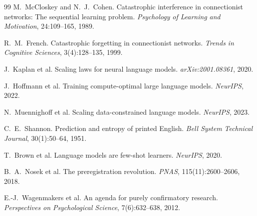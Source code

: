 \documentclass[11pt,a4paper]{article}
\begin{document}
\begin{thebibliography}{99}
M.~McCloskey and N.~J.~Cohen.
\newblock Catastrophic interference in connectionist networks: The sequential learning problem.
\newblock \emph{Psychology of Learning and Motivation}, 24:109--165, 1989.

R.~M.~French.
\newblock Catastrophic forgetting in connectionist networks.
\newblock \emph{Trends in Cognitive Sciences}, 3(4):128--135, 1999.

J.~Kaplan et al.
\newblock Scaling laws for neural language models.
\newblock \emph{arXiv:2001.08361}, 2020.

J.~Hoffmann et al.
\newblock Training compute-optimal large language models.
\newblock \emph{NeurIPS}, 2022.

N.~Muennighoff et al.
\newblock Scaling data-constrained language models.
\newblock \emph{NeurIPS}, 2023.

C.~E.~Shannon.
\newblock Prediction and entropy of printed English.
\newblock \emph{Bell System Technical Journal}, 30(1):50--64, 1951.

T.~Brown et al.
\newblock Language models are few-shot learners.
\newblock \emph{NeurIPS}, 2020.

B.~A.~Nosek et al.
\newblock The preregistration revolution.
\newblock \emph{PNAS}, 115(11):2600--2606, 2018.

E.-J.~Wagenmakers et al.
\newblock An agenda for purely confirmatory research.
\newblock \emph{Perspectives on Psychological Science}, 7(6):632--638, 2012.

\end{thebibliography}
\end{document}
